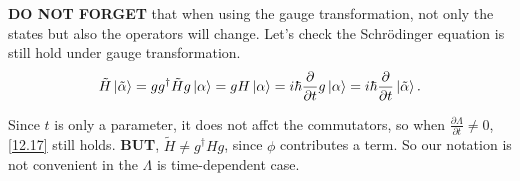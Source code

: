 \documentclass{article}
\theoremstyle{1}
\newcommand{\pa}{\partial}
\begin{document}
\textbf{DO NOT FORGET} that when using the gauge transformation, not only the states but also the operators will change. Let's check the Schrödinger equation is still hold under gauge transformation.
\begin{equation}
 \tilde{H} \ket{\tilde{\alpha}}=g g^\dagger \tilde{H}g\ket{\alpha}=g H\ket{\alpha}=i\hbar  \frac{\pa}{\pa t}g \ket{\alpha}=i\hbar \frac{\pa }{\pa t}\ket{\tilde{\alpha}}.
\end{equation}

Since $t$ is only a parameter, it does not affct the commutators, so when $\frac{\pa\Lambda}{\pa t}\not=0$, \eqref{12.17} still holds. \textbf{BUT}, $\tilde{H}\not=g^\dagger Hg$, since  $\phi$ contributes a term. So our notation is not convenient in the $\Lambda$ is time-dependent case.
\end{document}

